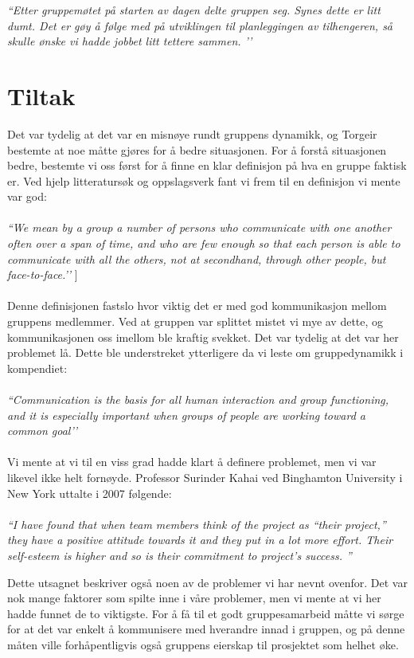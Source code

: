 \emph{``Etter gruppemøtet på starten av dagen delte gruppen seg. Synes dette er litt dumt. Det er gøy å følge med på utviklingen til planleggingen av tilhengeren, så skulle ønske vi hadde jobbet litt tettere sammen. ’’}

\section{Tiltak}
Det var tydelig at det var en misnøye rundt gruppens dynamikk, og Torgeir bestemte at noe måtte gjøres for å bedre situasjonen. For å forstå situasjonen bedre, bestemte vi oss først for å finne en klar definisjon på hva en gruppe faktisk er. Ved hjelp litteratursøk og oppslagsverk fant vi frem til en definisjon vi mente var god:\\\\
\emph{``We mean by a group a number of persons who communicate with one another often over a span of time, and who are few enough so that each person is able to communicate with all the others, not at secondhand, through other people, but face-to-face.’’} \cite{groundrules}]\\\\
Denne definisjonen fastslo hvor viktig det er med god kommunikasjon mellom gruppens medlemmer. Ved at gruppen var splittet mistet vi mye av dette, og kommunikasjonen oss imellom ble kraftig svekket. Det var tydelig at det var her problemet lå. Dette ble understreket ytterligere da vi leste om gruppedynamikk i kompendiet:\\\\
\emph{``Communication is the basis for all human interaction and group functioning, and it is especially important when groups of people are working toward a common goal’’} \cite{groundrules}\\\\
Vi mente at vi til en viss grad hadde klart å definere problemet, men vi var likevel ikke helt fornøyde. Professor Surinder Kahai ved Binghamton University i New York uttalte i 2007 følgende:\\\\
\emph{``I have found that when team members think of the project as “their project,” they have a positive attitude towards it and they put in a lot more effort. Their self-esteem is higher and so is their commitment to project’s success. ''} \cite{leading}\newline

Dette utsagnet beskriver også noen av de problemer vi har nevnt ovenfor. Det var nok mange faktorer som spilte inne i våre problemer, men vi mente at vi her hadde funnet de to viktigste. For å få til et godt gruppesamarbeid måtte vi sørge for at det var enkelt å kommunisere med hverandre innad i gruppen, og på denne måten ville forhåpentligvis også gruppens eierskap til prosjektet som helhet øke.


